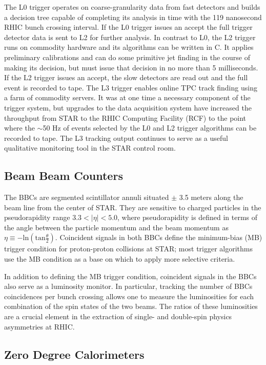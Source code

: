 The L0 trigger operates on coarse-granularity data from fast detectors and
builds a decision tree capable of completing its analysis in time with the 119
nanosecond RHIC bunch crossing interval. If the L0 trigger issues an accept
the full trigger detector data is sent to L2 for further analysis. In contrast
to L0, the L2 trigger runs on commodity hardware and its algorithms can be
written in C. It applies preliminary calibrations and can do some primitive
jet finding in the course of making its decision, but must issue that decision
in no more than 5 milliseconds. If the L2 trigger issues an accept, the slow
detectors are read out and the full event is recorded to tape. The L3 trigger
\cite{Adler:2002ab} enables online TPC track finding using a farm of commodity
servers. It was at one time a necessary component of the trigger system, but
upgrades to the data acquisition system have increased the throughput from
STAR to the RHIC Computing Facility (RCF) to the point where the $\sim$50 Hz
of events selected by the L0 and L2 trigger algorithms can be recorded to
tape. The L3 tracking output continues to serve as a useful qualitative
monitoring tool in the STAR control room.

\subsection{Beam Beam Counters}

The BBCs \cite{Kiryluk:2003aw} are segmented scintillator annuli situated
$\pm$ 3.5 meters along the beam line from the center of STAR. They are
sensitive to charged particles in the pseudorapidity range $3.3 < |\eta| <
5.0$, where pseudorapidity is defined in terms of the angle between the
particle momentum and the beam momentum as $\eta \equiv
-\mathrm{ln}\left(\mathrm{tan} \frac{\theta}{2}\right)$. Coincident signals in
both BBCs define the minimum-bias (MB) trigger condition for proton-proton
collisions at STAR; most trigger algorithms use the MB condition as a base on
which to apply more selective criteria.

In addition to defining the MB trigger condition, coincident signals in the
BBCs also serve as a luminosity monitor. In particular, tracking the
number of BBCs coincidences per bunch crossing allows one to measure the
luminosities for each combination of the spin states of the two beams. The
ratios of these luminosities are a crucial element in the extraction of
single- and double-spin physics asymmetries at RHIC.

\subsection{Zero Degree Calorimeters}

